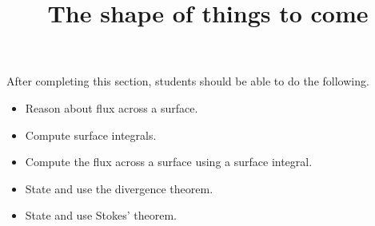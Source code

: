 \documentclass{ximera}
\title{The shape of things to come}
\begin{document}
\begin{abstract}
\end{abstract}
\maketitle
\begin{sectionOutcomes}

After completing this section, students should be able to do the following.

\begin{itemize}
\item Reason about flux across a surface.
\item Compute surface integrals.
\item Compute the flux across a surface using a surface integral.
\item State and use the divergence theorem.
\item State and use Stokes' theorem.
\end{itemize}

\end{sectionOutcomes}
\end{document}

